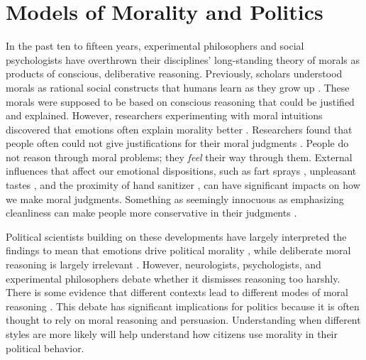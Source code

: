 %
%
%
%
%
%




\section{Models of Morality and Politics}
In the past ten to fifteen years, experimental philosophers and social psychologists have overthrown their disciplines' long-standing theory of morals as products of conscious, deliberative reasoning. Previously, scholars understood morals as rational social constructs that humans learn as they grow up \cite{Kohlberg1981}. These morals were supposed to be based on conscious reasoning that could be justified and explained. However, researchers experimenting with moral intuitions discovered that emotions often explain morality better \cite{Cushmanetal2006,Haidt2001}. Researchers found that people often could not give justifications for their moral judgments \cite{Haidtetal1993}. People do not reason through moral problems; they \emph{feel} their way through them. External influences that affect our emotional dispositions, such as fart sprays \cite{Schnalletal2008}, unpleasant tastes \cite{Eskineetal2011}, and the proximity of hand sanitizer \cite{HelzerPizarro2011}, can have significant impacts on how we make moral judgments. Something as seemingly innocuous as emphasizing cleanliness can make people more conservative in their judgments \cite{ZhongLiljenquist2006}.

Political scientists building on these developments have largely interpreted the findings to mean that emotions drive political morality \cite{Haidt2001}, while deliberate moral reasoning is largely irrelevant \cite{CliffordJerit2013,Kolevaetal2012,WeberFederico2012}. However, neurologists, psychologists, and experimental philosophers debate whether it dismisses reasoning too harshly. There is some evidence that different contexts lead to different modes of moral reasoning \cite{CushmanYoungGreene2010,Greeneetal2001}. This debate has significant implications for politics because it is often thought to rely on moral reasoning and persuasion. Understanding when different styles are more likely will help understand how citizens use morality in their political behavior.

